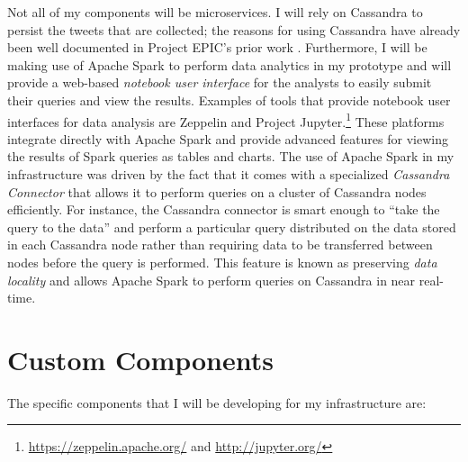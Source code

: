 Not all of my components will be microservices. I will rely on Cassandra to persist the tweets that are collected; the reasons for using Cassandra have already been well documented in Project EPIC’s prior work \parencite{icse11,oopsla12,hiccs15}. Furthermore, I will be making use of Apache Spark to perform data analytics in my prototype and will provide a web-based \textit{notebook user interface} for the analysts to easily submit their queries and view the results. Examples of tools that provide notebook user interfaces for data analysis are Zeppelin and Project Jupyter.\footnote{\href{https://zeppelin.apache.org/}{https://zeppelin.apache.org/} and \href{http://jupyter.org/}{http://jupyter.org/}} These platforms integrate directly with Apache Spark and provide advanced features for viewing the results of Spark queries as tables and charts. The use of Apache Spark in my infrastructure was driven by the fact that it comes with a specialized \textit{Cassandra Connector} that allows it to perform queries on a cluster of Cassandra nodes efficiently. For instance, the Cassandra connector is smart enough to ``take the query to the data'' and perform a particular query distributed on the data stored in each Cassandra node rather than requiring data to be transferred between nodes before the query is performed. This feature is known as preserving \textit{data locality} and allows Apache Spark to perform queries on Cassandra in near real-time.

\section{Custom Components}

The specific components that I will be developing for my infrastructure are:

